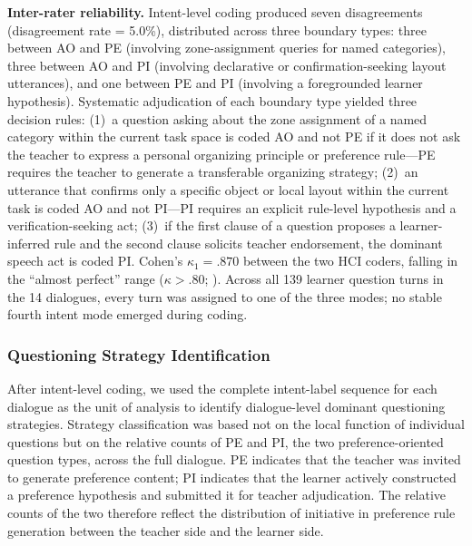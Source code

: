 \documentclass[manuscript,review,anonymous]{acmart}
\begin{document}
\textbf{Inter-rater reliability.} Intent-level coding produced seven disagreements (disagreement rate = 5.0\%), distributed across three boundary types: three between AO and PE (involving zone-assignment queries for named categories), three between AO and PI (involving declarative or confirmation-seeking layout utterances), and one between PE and PI (involving a foregrounded learner hypothesis). Systematic adjudication of each boundary type yielded three decision rules: (1)~a question asking about the zone assignment of a named category within the current task space is coded AO and not PE if it does not ask the teacher to express a personal organizing principle or preference rule---PE requires the teacher to generate a transferable organizing strategy; (2)~an utterance that confirms only a specific object or local layout within the current task is coded AO and not PI---PI requires an explicit rule-level hypothesis and a verification-seeking act; (3)~if the first clause of a question proposes a learner-inferred rule and the second clause solicits teacher endorsement, the dominant speech act is coded PI. Cohen's $\kappa_1 = \mathbf{.870}$ between the two HCI coders, falling in the ``almost perfect'' range ($\kappa > .80$; \citealt{landis1977measurement}). Across all 139 learner question turns in the 14 dialogues, every turn was assigned to one of the three modes; no stable fourth intent mode emerged during coding.

\subsubsection{Questioning Strategy Identification}
\label{sec:strategy-id}

After intent-level coding, we used the complete intent-label sequence for each dialogue as the unit of analysis to identify dialogue-level dominant questioning strategies. Strategy classification was based not on the local function of individual questions but on the relative counts of PE and PI, the two preference-oriented question types, across the full dialogue. PE indicates that the teacher was invited to generate preference content; PI indicates that the learner actively constructed a preference hypothesis and submitted it for teacher adjudication. The relative counts of the two therefore reflect the distribution of initiative in preference rule generation between the teacher side and the learner side.
\end{document}
